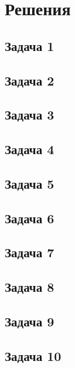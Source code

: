 
\newpage
\section*{Решения}
\subsection*{Задача 1}
\vskip 0.4in

\subsection*{Задача 2}
\vskip 0.4in

\subsection*{Задача 3}
\vskip 0.4in

\subsection*{Задача 4}
\vskip 0.4in

\subsection*{Задача 5}
\vskip 0.4in

\subsection*{Задача 6}
\vskip 0.4in

\subsection*{Задача 7}
\vskip 0.4in

\subsection*{Задача 8}
\vskip 0.4in

\subsection*{Задача 9}
\vskip 0.4in

\subsection*{Задача 10}
